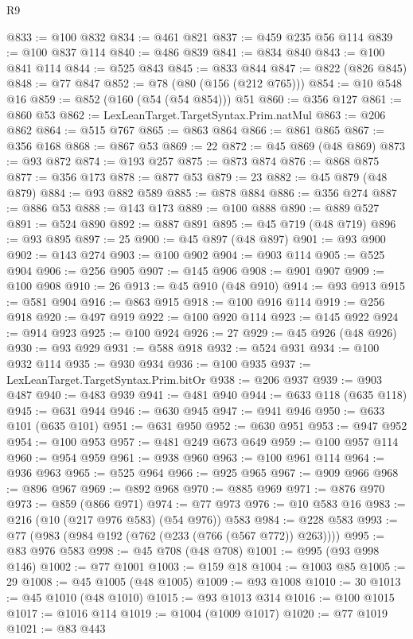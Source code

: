 \begin{lexlean}{R9}
\begin{coremodule}
{{{{{{{{{{{{{{{{{{{{{{{{{{{{{{{{{{{{{{{{{{{{{{{{{{{{{{{{{{{{{{{{{{{{{{{{{{{{{{{{{{{{{{{{{{{{{{{{{{{{{{{{{{{{@833 := @100 @832
@834 := @461 @821
@837 := @459 @235 @56 @114
@839 := @100 @837 @114
@840 := @486 @839
@841 := @834 @840
@843 := @100 @841 @114
@844 := @525 @843
@845 := @833 @844
@847 := @822 (@826 @845)
@848 := @77 @847
@852 := @78 (@80 (@156 (@212 @765)))
@854 := @10 @548 @16
@859 := @852 (@160 (@54 (@54 @854))) @51
@860 := @356 @127
@861 := @860 @53
@862 := LexLeanTarget.TargetSyntax.Prim.natMul
@863 := @206 @862
@864 := @515 @767
@865 := @863 @864
@866 := @861 @865
@867 := @356 @168
@868 := @867 @53
@869 := 22
@872 := @45 @869 (@48 @869)
@873 := @93 @872
@874 := @193 @257
@875 := @873 @874
@876 := @868 @875
@877 := @356 @173
@878 := @877 @53
@879 := 23
@882 := @45 @879 (@48 @879)
@884 := @93 @882 @589
@885 := @878 @884
@886 := @356 @274
@887 := @886 @53
@888 := @143 @173
@889 := @100 @888
@890 := @889 @527
@891 := @524 @890
@892 := @887 @891
@895 := @45 @719 (@48 @719)
@896 := @93 @895
@897 := 25
@900 := @45 @897 (@48 @897)
@901 := @93 @900
@902 := @143 @274
@903 := @100 @902
@904 := @903 @114
@905 := @525 @904
@906 := @256 @905
@907 := @145 @906
@908 := @901 @907
@909 := @100 @908
@910 := 26
@913 := @45 @910 (@48 @910)
@914 := @93 @913
@915 := @581 @904
@916 := @863 @915
@918 := @100 @916 @114
@919 := @256 @918
@920 := @497 @919
@922 := @100 @920 @114
@923 := @145 @922
@924 := @914 @923
@925 := @100 @924
@926 := 27
@929 := @45 @926 (@48 @926)
@930 := @93 @929
@931 := @588 @918
@932 := @524 @931
@934 := @100 @932 @114
@935 := @930 @934
@936 := @100 @935
@937 := LexLeanTarget.TargetSyntax.Prim.bitOr
@938 := @206 @937
@939 := @903 @487
@940 := @483 @939
@941 := @481 @940
@944 := @633 @118 (@635 @118)
@945 := @631 @944
@946 := @630 @945
@947 := @941 @946
@950 := @633 @101 (@635 @101)
@951 := @631 @950
@952 := @630 @951
@953 := @947 @952
@954 := @100 @953
@957 := @481 @249 @673 @649
@959 := @100 @957 @114
@960 := @954 @959
@961 := @938 @960
@963 := @100 @961 @114
@964 := @936 @963
@965 := @525 @964
@966 := @925 @965
@967 := @909 @966
@968 := @896 @967
@969 := @892 @968
@970 := @885 @969
@971 := @876 @970
@973 := @859 (@866 @971)
@974 := @77 @973
@976 := @10 @583 @16
@983 := @216 (@10 (@217 @976 @583) (@54 @976)) @583
@984 := @228 @583
@993 := @77 (@983 (@984 @192 (@762 (@233 (@766 (@567 @772)) @263))))
@995 := @83 @976 @583
@998 := @45 @708 (@48 @708)
@1001 := @995 (@93 @998 @146)
@1002 := @77 @1001
@1003 := @159 @18
@1004 := @1003 @85
@1005 := 29
@1008 := @45 @1005 (@48 @1005)
@1009 := @93 @1008
@1010 := 30
@1013 := @45 @1010 (@48 @1010)
@1015 := @93 @1013 @314
@1016 := @100 @1015
@1017 := @1016 @114
@1019 := @1004 (@1009 @1017)
@1020 := @77 @1019
@1021 := @83 @443
}}}}}}}}}}}}}}}}}}}}}}}}}}}}}}}}}}}}}}}}}}}}}}}}}}}}}}}}}}}}}}}}}}}}}}}}}}}}}}}}}}}}}}}}}}}}}}}}}}}}}}}}}}}}
\end{coremodule}
\end{lexlean}
